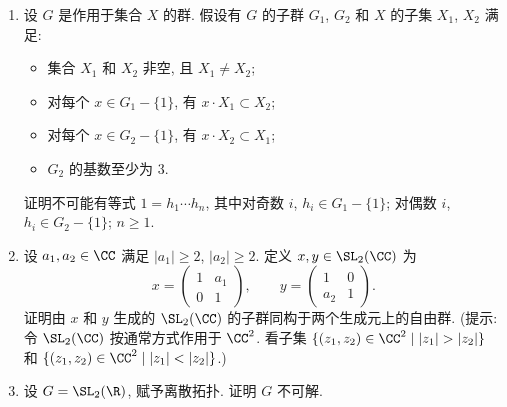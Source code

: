 \begin{exercise}[$\SL_2(\R)$ 不可解]
\label{ex:III.6.3.7}
\begin{enumerate}
\item[(a)] 设 $G$ 是作用于集合 $X$ 的群. 假设有 $G$ 的子群 $G_1$, $G_2$ 和 $X$ 的子集 $X_1$, $X_2$ 满足:
\begin{itemize}
\item 集合 $X_1$ 和 $X_2$ 非空, 且 $X_1 \neq X_2$;
\item 对每个 $x \in G_1 - \{1\}$, 有 $x \cdot X_1 \subset X_2$;
\item 对每个 $x \in G_2 - \{1\}$, 有 $x \cdot X_2 \subset X_1$;
\item $G_2$ 的基数至少为 $3$.
\end{itemize}
证明不可能有等式 $1 = h_1\cdots h_n$, 其中对奇数 $i$, $h_i \in G_1 - \{1\}$; 对偶数 $i$, $h_i \in G_2 - \{1\}$; $n \geq 1$.
\item[(b)] 设 $a_1, a_2 \in \CC$ 满足 $|a_1| \geq 2$, $|a_2| \geq 2$. 定义 $x, y \in \SL_2(\CC)$ 为
\[
x = \begin{pmatrix} 1 & a_1 \\ 0 & 1 \end{pmatrix}, \qquad y = \begin{pmatrix} 1 & 0 \\ a_2 & 1 \end{pmatrix}.
\]
证明由 $x$ 和 $y$ 生成的 $\SL_2(\CC)$ 的子群同构于两个生成元上的自由群. (提示: 令 $\SL_2(\CC)$ 按通常方式作用于 $\CC^2$. 看子集 $\{(z_1, z_2) \in \CC^2 \mid |z_1| > |z_2|\}$ 和 $\{(z_1, z_2) \in \CC^2 \mid |z_1| < |z_2|\}$.)
\item[(c)] 设 $G = \SL_2(\R)$, 赋予离散拓扑. 证明 $G$ 不可解.
\end{enumerate}
\end{exercise}

